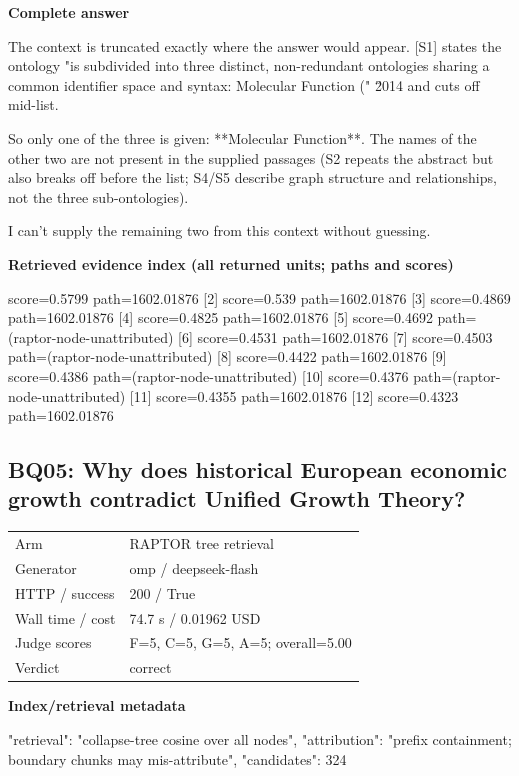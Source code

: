\documentclass[10pt]{article}
\begin{document}
\textbf{Complete answer}
\begin{AnswerText}
The context is truncated exactly where the answer would appear. [S1] states the ontology "is subdivided into three distinct, non-redundant ontologies sharing a common identifier space and syntax: Molecular Function (" \u2014 and cuts off mid-list.

So only one of the three is given: **Molecular Function**. The names of the other two are not present in the supplied passages (S2 repeats the abstract but also breaks off before the list; S4/S5 describe graph structure and relationships, not the three sub-ontologies).

I can't supply the remaining two from this context without guessing.
\end{AnswerText}

\textbf{Retrieved evidence index (all returned units; paths and scores) }
\begin{EvidenceText}
[1] score=0.5799 path=1602.01876
[2] score=0.539 path=1602.01876
[3] score=0.4869 path=1602.01876
[4] score=0.4825 path=1602.01876
[5] score=0.4692 path=(raptor-node-unattributed)
[6] score=0.4531 path=1602.01876
[7] score=0.4503 path=(raptor-node-unattributed)
[8] score=0.4422 path=1602.01876
[9] score=0.4386 path=(raptor-node-unattributed)
[10] score=0.4376 path=(raptor-node-unattributed)
[11] score=0.4355 path=1602.01876
[12] score=0.4323 path=1602.01876
\end{EvidenceText}
\subsection{BQ05: Why does historical European economic growth contradict Unified Growth Theory?}
\begin{tabular}{@{}ll@{}}
Arm & RAPTOR tree retrieval\\
Generator & omp / deepseek-flash\\
HTTP / success & 200 / True\\
Wall time / cost & 74.7 s / 0.01962 USD\\
Judge scores & F=5, C=5, G=5, A=5; overall=5.00\\
Verdict & correct\\
\end{tabular}

\textbf{Index/retrieval metadata}
\begin{EvidenceText}
{
  "retrieval": "collapse-tree cosine over all nodes",
  "attribution": "prefix containment; boundary chunks may mis-attribute",
  "candidates": 324
}
\end{EvidenceText}
\end{document}
